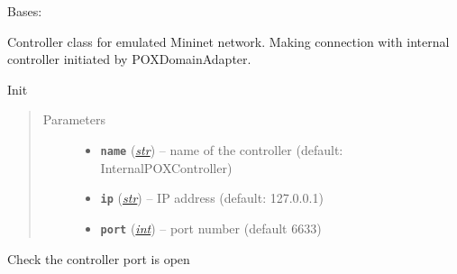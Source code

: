 \documentclass[letterpaper,10pt,english]{sphinxmanual}
\begin{document}
\begin{fulllineitems}
\label{infr/topology:escape.infr.topology.InternalControllerProxy}
Bases: 

Controller class for emulated Mininet network. Making connection with
internal controller initiated by POXDomainAdapter.

\begin{fulllineitems}
\label{infr/topology:escape.infr.topology.InternalControllerProxy.__init__}
Init
\begin{quote}\begin{description}
\item[{Parameters}] \leavevmode\begin{itemize}
\item {} 
\textbf{\texttt{name}} (\href{https://docs.python.org/2.7/library/functions.html\#str}{\emph{str}}) -- name of the controller (default: InternalPOXController)

\item {} 
\textbf{\texttt{ip}} (\href{https://docs.python.org/2.7/library/functions.html\#str}{\emph{str}}) -- IP address (default: 127.0.0.1)

\item {} 
\textbf{\texttt{port}} (\href{https://docs.python.org/2.7/library/functions.html\#int}{\emph{int}}) -- port number (default 6633)

\end{itemize}

\end{description}\end{quote}

\end{fulllineitems}


\begin{fulllineitems}
\label{infr/topology:escape.infr.topology.InternalControllerProxy.checkListening}
Check the controller port is open

\end{fulllineitems}


\end{fulllineitems}
\end{document}
